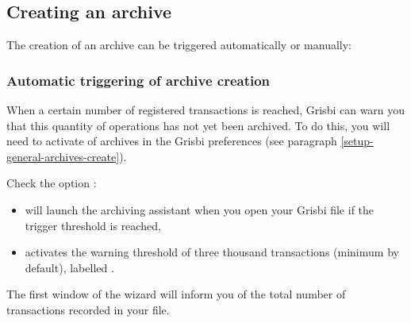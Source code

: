\subsection{Creating an archive\label{datamanagement-archive-new}}%

The creation of an archive can be triggered automatically or manually:

\subsubsection{Automatic triggering of archive creation\label{datamanagement-archive-auto}}

When a certain number of registered transactions is reached, Grisbi can warn you that this quantity of operations has not yet been archived. To do this, you will need to activate  of archives in the Grisbi preferences (see paragraph \vref{setup-general-archives-create}).

Check the option :
\begin{itemize}
	\item will launch the archiving assistant when you open your Grisbi file if the trigger threshold is reached,
	\item activates the warning threshold of three thousand transactions (minimum by default), labelled .
\end{itemize}

The first window of the  wizard will inform you of the total number of transactions recorded in your file.

